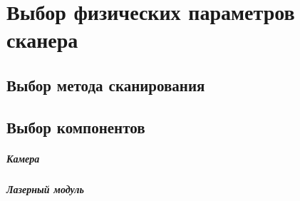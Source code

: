 \chapter{Выбор физических параметров сканера}
\section{Выбор метода сканирования}

\section{Выбор компонентов}
\paragraph{Камера}
\paragraph{Лазерный модуль}